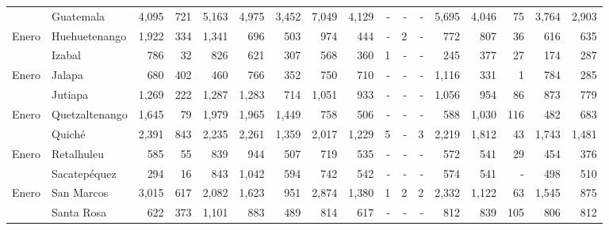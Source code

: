 \begin{landscape}
\begin{center}
\begin{longtable}{llrrrrrrrrrrrrrrr}
			\rowcolor{color1!5!white}\multicolumn{1}{l}{	\footnotesize	 Enero 	}&	 Guatemala 	&	 4,095 	&	 721 	&	 5,163 	&	 4,975 	&	 3,452 	&	 7,049 	&	 4,129 	&	 -   	&	 -   	&	 -   	&	 5,695 	&	 4,046 	&	 75 	&	 3,764 	&	 2,903 	\\
			\multicolumn{1}{l}{	\footnotesize	 Enero 	}&	 Huehuetenango 	&	 1,922 	&	 334 	&	 1,341 	&	 696 	&	 503 	&	 974 	&	 444 	&	 -   	&	 2 	&	 -   	&	 772 	&	 807 	&	 36 	&	 616 	&	 635 	\\
			\rowcolor{color1!5!white}\multicolumn{1}{l}{	\footnotesize	 Enero 	}&	 Izabal 	&	 786 	&	 32 	&	 826 	&	 621 	&	 307 	&	 568 	&	 360 	&	 1 	&	 -   	&	 -   	&	 245 	&	 377 	&	 27 	&	 174 	&	 287 	\\
			\multicolumn{1}{l}{	\footnotesize	 Enero 	}&	 Jalapa 	&	 680 	&	 402 	&	 460 	&	 766 	&	 352 	&	 750 	&	 710 	&	 -   	&	 -   	&	 -   	&	 1,116 	&	 331 	&	 1 	&	 784 	&	 285 	\\
			\rowcolor{color1!5!white}\multicolumn{1}{l}{	\footnotesize	 Enero 	}&	 Jutiapa 	&	 1,269 	&	 222 	&	 1,287 	&	 1,283 	&	 714 	&	 1,051 	&	 933 	&	 -   	&	 -   	&	 -   	&	 1,056 	&	 954 	&	 86 	&	 873 	&	 779 	\\
			\multicolumn{1}{l}{	\footnotesize	 Enero 	}&	 Quetzaltenango 	&	 1,645 	&	 79 	&	 1,979 	&	 1,965 	&	 1,449 	&	 758 	&	 506 	&	 -   	&	 -   	&	 -   	&	 588 	&	 1,030 	&	 116 	&	 482 	&	 683 	\\
			\rowcolor{color1!5!white}\multicolumn{1}{l}{	\footnotesize	 Enero 	}&	 Quiché 	&	 2,391 	&	 843 	&	 2,235 	&	 2,261 	&	 1,359 	&	 2,017 	&	 1,229 	&	 5 	&	 -   	&	 3 	&	 2,219 	&	 1,812 	&	 43 	&	 1,743 	&	 1,481 	\\
			\multicolumn{1}{l}{	\footnotesize	 Enero 	}&	 Retalhuleu 	&	 585 	&	 55 	&	 839 	&	 944 	&	 507 	&	 719 	&	 535 	&	 -   	&	 -   	&	 -   	&	 572 	&	 541 	&	 29 	&	 454 	&	 376 	\\
			\rowcolor{color1!5!white}\multicolumn{1}{l}{	\footnotesize	 Enero 	}&	 Sacatepéquez 	&	 294 	&	 16 	&	 843 	&	 1,042 	&	 594 	&	 742 	&	 542 	&	 -   	&	 -   	&	 -   	&	 574 	&	 541 	&	 -   	&	 498 	&	 510 	\\
			\multicolumn{1}{l}{	\footnotesize	 Enero 	}&	 San Marcos 	&	 3,015 	&	 617 	&	 2,082 	&	 1,623 	&	 951 	&	 2,874 	&	 1,380 	&	 1 	&	 2 	&	 2 	&	 2,332 	&	 1,122 	&	 63 	&	 1,545 	&	 875 	\\
			\rowcolor{color1!5!white}\multicolumn{1}{l}{	\footnotesize	 Enero 	}&	 Santa Rosa 	&	 622 	&	 373 	&	 1,101 	&	 883 	&	 489 	&	 814 	&	 617 	&	 -   	&	 -   	&	 -   	&	 812 	&	 839 	&	 105 	&	 806 	&	 812 	\\

\end{longtable}
\end{center}
\end{landscape}
